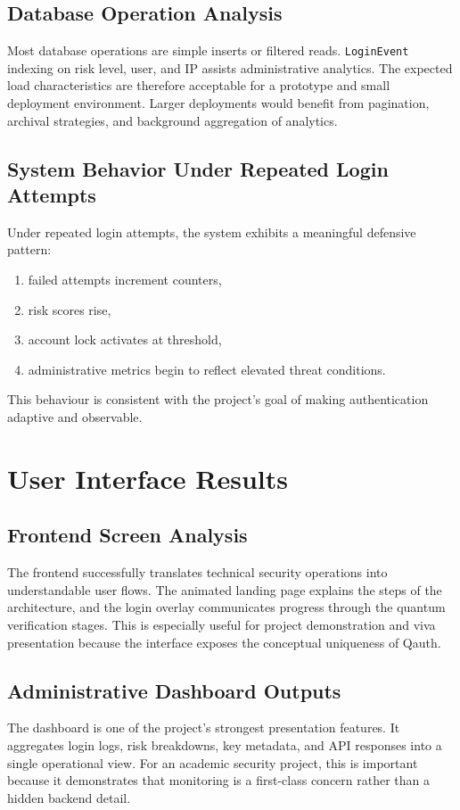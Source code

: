 \subsection{Database Operation Analysis}
Most database operations are simple inserts or filtered reads. \texttt{LoginEvent} indexing on risk level, user, and IP assists administrative analytics. The expected load characteristics are therefore acceptable for a prototype and small deployment environment. Larger deployments would benefit from pagination, archival strategies, and background aggregation of analytics.

\subsection{System Behavior Under Repeated Login Attempts}
Under repeated login attempts, the system exhibits a meaningful defensive pattern:

\begin{enumerate}
    \item failed attempts increment counters,
    \item risk scores rise,
    \item account lock activates at threshold,
    \item administrative metrics begin to reflect elevated threat conditions.
\end{enumerate}

This behaviour is consistent with the project's goal of making authentication adaptive and observable.

\section{User Interface Results}

\subsection{Frontend Screen Analysis}
The frontend successfully translates technical security operations into understandable user flows. The animated landing page explains the steps of the architecture, and the login overlay communicates progress through the quantum verification stages. This is especially useful for project demonstration and viva presentation because the interface exposes the conceptual uniqueness of Qauth.

\subsection{Administrative Dashboard Outputs}
The dashboard is one of the project's strongest presentation features. It aggregates login logs, risk breakdowns, key metadata, and API responses into a single operational view. For an academic security project, this is important because it demonstrates that monitoring is a first-class concern rather than a hidden backend detail.

